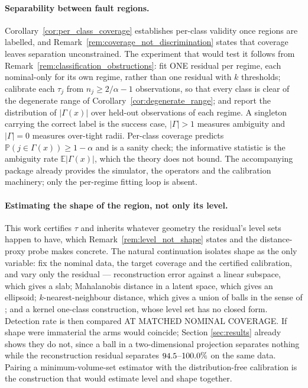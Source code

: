 \documentclass[a4paper]{cas-sc}
\newcommand{\Prob}{\ensuremath{\mathbb{P}}}
\newcommand{\Expect}{\ensuremath{\mathbb{E}}}
\begin{document}
\paragraph{Separability between fault regions.}
Corollary~\ref{cor:per_class_coverage} establishes per-class validity once
regions are labelled, and Remark~\ref{rem:coverage_not_discrimination} states
that coverage leaves separation unconstrained. The experiment that would test
it follows from Remark~\ref{rem:classification_obstructions}: fit ONE residual
per regime, each nominal-only for its own regime, rather than one residual
with \(k\) thresholds; calibrate each \(\tau_j\) from
\(n_j \ge 2/\alpha - 1\) observations, so that every class is clear of the
degenerate range of Corollary~\ref{cor:degenerate_range}; and report the
distribution of \(|\Gamma(x)|\) over held-out observations of each regime.
A singleton carrying the correct label is the success case, \(|\Gamma|>1\)
measures ambiguity and \(|\Gamma|=0\) measures over-tight radii. Per-class
coverage predicts \(\Prob(j \in \Gamma(x)) \ge 1-\alpha\) and is a sanity
check; the informative statistic is the ambiguity rate \(\Expect|\Gamma(x)|\),
which the theory does not bound. The accompanying package already provides the
simulator, the operators and the calibration machinery; only the per-regime
fitting loop is absent.

\paragraph{Estimating the shape of the region, not only its level.}
This work certifies \(\tau\) and inherits whatever geometry the residual's
level sets happen to have, which
Remark~\ref{rem:level_not_shape} states and the distance-proxy probe makes
concrete. The natural continuation isolates shape as the only variable: fix
the nominal data, the target coverage and the certified calibration, and vary
only the residual --- reconstruction error against a linear subspace, which
gives a slab; Mahalanobis distance in a latent space, which gives an
ellipsoid; \(k\)-nearest-neighbour distance, which gives a union of balls in
the sense of \citet{devroye1980}; and a kernel one-class construction, whose
level set has no closed form. Detection rate is then compared AT MATCHED
NOMINAL COVERAGE. If shape were immaterial the arms would coincide; Section
\ref{sec:results} already shows they do not, since a ball in a two-dimensional
projection separates nothing while the reconstruction residual separates
\(94.5\)--\(100.0\%\) on the same data. Pairing a
minimum-volume-set estimator with the distribution-free calibration is the
construction that would estimate level and shape together.
\end{document}
